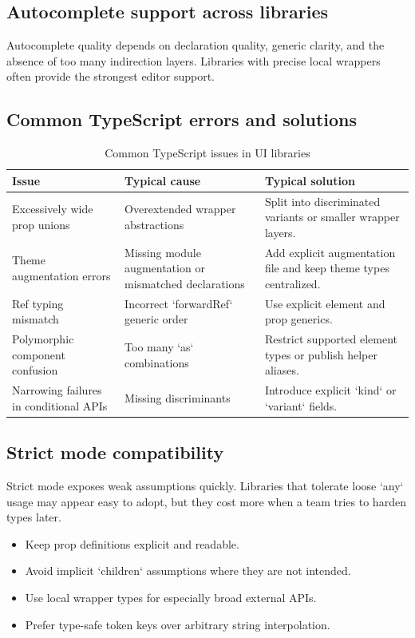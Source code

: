 \subsection{Autocomplete support across libraries}
Autocomplete quality depends on declaration quality, generic clarity, and the absence of too many indirection layers. Libraries with precise local wrappers often provide the strongest editor support.

\subsection{Common TypeScript errors and solutions}
\begin{table}[htbp]
  \centering
  \caption{Common TypeScript issues in UI libraries}
  \begin{tabularx}{\textwidth}{@{}p{}p{}Y@{}}
    \toprule
    \textbf{Issue} & \textbf{Typical cause} & \textbf{Typical solution} \\
    \midrule
    Excessively wide prop unions & Overextended wrapper abstractions & Split into discriminated variants or smaller wrapper layers. \\
    Theme augmentation errors & Missing module augmentation or mismatched declarations & Add explicit augmentation file and keep theme types centralized. \\
    Ref typing mismatch & Incorrect `forwardRef` generic order & Use explicit element and prop generics. \\
    Polymorphic component confusion & Too many `as` combinations & Restrict supported element types or publish helper aliases. \\
    Narrowing failures in conditional APIs & Missing discriminants & Introduce explicit `kind` or `variant` fields. \\
    \bottomrule
  \end{tabularx}
\end{table}

\subsection{Strict mode compatibility}
Strict mode exposes weak assumptions quickly. Libraries that tolerate loose `any` usage may appear easy to adopt, but they cost more when a team tries to harden types later.

\begin{itemize}[leftmargin=*, itemsep=0.35em]
  \item Keep prop definitions explicit and readable.
  \item Avoid implicit `children` assumptions where they are not intended.
  \item Use local wrapper types for especially broad external APIs.
  \item Prefer type-safe token keys over arbitrary string interpolation.
\end{itemize}

